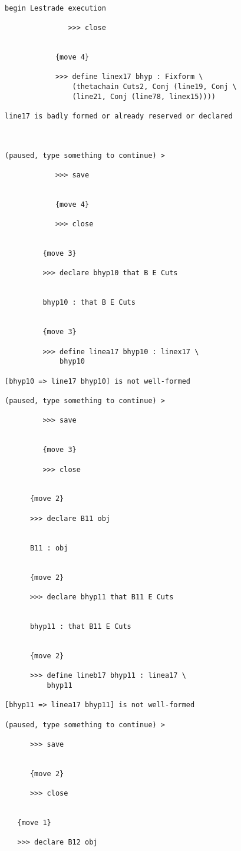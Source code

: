 \documentclass[12pt]{article}
\begin{document}
\begin{verbatim}

begin Lestrade execution

               >>> close


            {move 4}

            >>> define linex17 bhyp : Fixform \
                (thetachain Cuts2, Conj (line19, Conj \
                (line21, Conj (line78, linex15))))

line17 is badly formed or already reserved or declared



(paused, type something to continue) >

            >>> save


            {move 4}

            >>> close


         {move 3}

         >>> declare bhyp10 that B E Cuts


         bhyp10 : that B E Cuts


         {move 3}

         >>> define linea17 bhyp10 : linex17 \
             bhyp10

[bhyp10 => line17 bhyp10] is not well-formed

(paused, type something to continue) >

         >>> save


         {move 3}

         >>> close


      {move 2}

      >>> declare B11 obj


      B11 : obj


      {move 2}

      >>> declare bhyp11 that B11 E Cuts


      bhyp11 : that B11 E Cuts


      {move 2}

      >>> define lineb17 bhyp11 : linea17 \
          bhyp11

[bhyp11 => linea17 bhyp11] is not well-formed

(paused, type something to continue) >

      >>> save


      {move 2}

      >>> close


   {move 1}

   >>> declare B12 obj



\end{verbatim}
\end{document}
